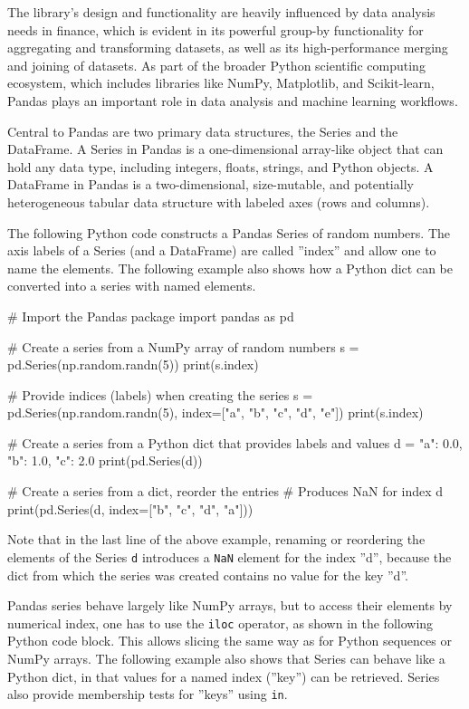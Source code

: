 The library's design and functionality are heavily influenced by data analysis needs in finance, which is evident in its powerful group-by functionality for aggregating and transforming datasets, as well as its high-performance merging and joining of datasets. As part of the broader Python scientific computing ecosystem, which includes libraries like NumPy, Matplotlib, and Scikit-learn, Pandas plays an important role in data analysis and machine learning workflows.

Central to Pandas are two primary data structures, the Series and the DataFrame. A Series in Pandas is a one-dimensional array-like object that can hold any data type, including integers, floats, strings, and Python objects. A DataFrame in Pandas is a two-dimensional, size-mutable, and potentially heterogeneous tabular data structure with labeled axes (rows and columns).

The following Python code constructs a Pandas Series of random numbers. The axis labels of a Series (and a DataFrame) are called ''index'' and allow one to name the elements. The following example also shows how a Python dict can be converted into a series with named elements.

\begin{samepage}
\begin{pythoncode}
# Import the Pandas package
import pandas as pd

# Create a series from a NumPy array of random numbers
s = pd.Series(np.random.randn(5))
print(s.index)

# Provide indices (labels) when creating the series
s = pd.Series(np.random.randn(5), index=["a", "b", "c", "d", "e"])
print(s.index)

# Create a series from a Python dict that provides labels and values
d = {"a": 0.0, "b": 1.0, "c": 2.0}
print(pd.Series(d))

# Create a series from a dict, reorder the entries
# Produces NaN for index d
print(pd.Series(d, index=["b", "c", "d", "a"]))
\end{pythoncode}
\end{samepage}

Note that in the last line of the above example, renaming or reordering the elements of the Series \texttt{d} introduces a \texttt{NaN} element for the index ''d'', because the dict from which the series was created contains no value for the key ''d''.

Pandas series behave largely like NumPy arrays, but to access their elements by numerical index, one has to use the \texttt{iloc} operator, as shown in the following Python code block. This allows slicing the same way as for Python sequences or NumPy arrays. The following example also shows that Series can behave like a Python dict, in that values for a named index (''key'') can be retrieved. Series also provide membership tests for ''keys'' using \texttt{in}.

